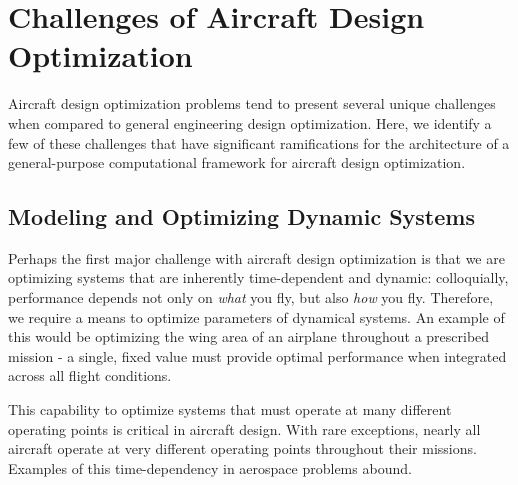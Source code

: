 \chapter{Challenges of Aircraft Design Optimization}
\label{chapter:challenges}

Aircraft design optimization problems tend to present several unique challenges when compared to general engineering design optimization. Here, we identify a few of these challenges that have significant ramifications for the architecture of a general-purpose computational framework for aircraft design optimization.


\section{Modeling and Optimizing Dynamic Systems}
\label{sect:dynamics}

Perhaps the first major challenge with aircraft design optimization is that we are optimizing systems that are inherently time-dependent and dynamic: colloquially, performance depends not only on \textit{what} you fly, but also \textit{how} you fly. Therefore, we require a means to optimize parameters of dynamical systems. An example of this would be optimizing the wing area of an airplane throughout a prescribed mission - a single, fixed value must provide optimal performance when integrated across all flight conditions.

This capability to optimize systems that must operate at many different operating points is critical in aircraft design. With rare exceptions, nearly all aircraft operate at very different operating points throughout their missions. Examples of this time-dependency in aerospace problems abound.

